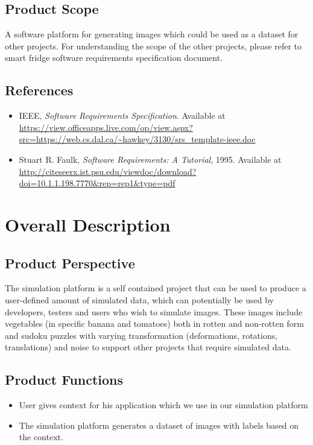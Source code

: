 \documentclass[a4paper,12pt]{article}
\begin{document}
\subsection{Product Scope}
A software platform for generating images which could be used as a dataset for other projects. For understanding the scope of the other projects, please refer to smart fridge software requirements specification document.
\subsection{References}
\begin{itemize}
\item IEEE, \textit{Software Requirements Specification}. Available at \url{https://view.officeapps.live.com/op/view.aspx?src=https://web.cs.dal.ca/~hawkey/3130/srs_template-ieee.doc}
\item Stuart R. Faulk, \textit{Software Requirements: A Tutorial}, 1995. Available at \url{http://citeseerx.ist.psu.edu/viewdoc/download?doi=10.1.1.198.7770&rep=rep1&type=pdf}
\end{itemize}
\newpage
\section{Overall Description}
\subsection{Product Perspective}
The simulation platform is a self contained project that can be used to produce a user-defined amount of simulated data, which can potentially be used by developers, testers and users who wish to simulate images. These images include vegetables (in specific banana and tomatoes) both in rotten and non-rotten form and sudoku puzzles with varying transformation (deformations, rotations, translations) and noise to support other projects that require simulated data.

\subsection{Product Functions}
\begin{itemize}
\item User gives context for his application which we use in our simulation platform
\item The simulation platform generates a dataset of images with labels based on the context.
\end{itemize}
\end{document}
